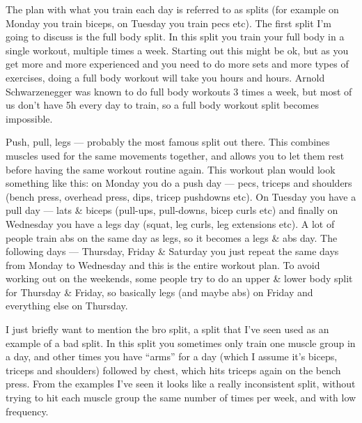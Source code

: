 \documentclass[openany, 12pt]{book}
\begin{document}
        The plan with what you train each day is referred to as splits (for example on Monday you train biceps, on Tuesday you train pecs etc).
        The first split I'm going to discuss is the full body split. In this split
        you train your full body in a single workout, multiple times a week. Starting out this might be ok, but as you get more and more experienced and you need to do more sets and more types of
        exercises, doing a full body workout will take you hours and hours. Arnold Schwarzenegger was known to do full body workouts 3 times a week, but most of us don't have 5h every day to train, so
        a full body workout split becomes impossible.

        Push, pull, legs --- probably the most famous split out there. This combines muscles used for the same movements together, and allows you to let them rest before having the same
        workout routine again. This workout plan would look something like this: on Monday you do a push day --- pecs, triceps and shoulders (bench press, overhead press, dips, tricep pushdowns etc).
        On Tuesday you have a pull day --- lats \& biceps (pull-ups, pull-downs, bicep curls etc) and finally on Wednesday you have a legs day (squat, leg curls, leg extensions etc). A lot of people
        train abs on the same day as legs, so it becomes a legs \& abs day. The following days --- Thursday, Friday \& Saturday you just repeat the same days from Monday to Wednesday and this is the
        entire workout plan. To avoid working out on the weekends, some people try to do an upper \& lower body split for Thursday \& Friday, so basically legs (and maybe abs) on Friday and everything
        else on Thursday. 

        I just briefly want to mention the bro split, a split that I've seen used as an example of a bad split. In this split you sometimes only train one muscle group in a day, and other times you
        have ``arms'' for a day (which I assume it's biceps, triceps and shoulders) followed by chest, which hits triceps again on the bench press. From the examples I've seen it looks like a really
        inconsistent split, without trying to hit each muscle group the same number of times per week, and with low frequency.
        
\end{document}
